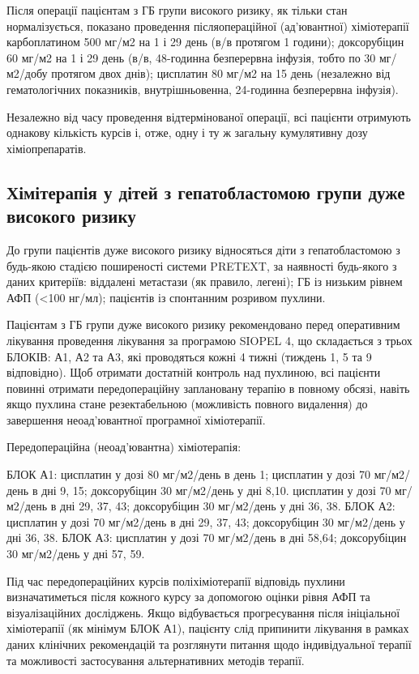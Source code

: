 Після операції пацієнтам з ГБ групи високого ризику, як тільки стан нормалізується, показано проведення післяопераційної (ад'ювантної) хіміотерапії карбоплатином 500 мг/м2 на 1 і 29 день (в/в протягом 1 години); доксорубіцин 60 мг/м2 на 1 і 29 день (в/в, 48-годинна безперервна інфузія, тобто по 30 мг/м2/добу протягом двох днів); цисплатин 80 мг/м2 на 15 день (незалежно від гематологічних показників, внутрішньовенна, 24-годинна безперервна інфузія)\cite{pmid28921939}.

Незалежно від часу проведення відтермінованої операції, всі пацієнти отримують однакову кількість курсів і, отже, одну і ту ж загальну кумулятивну дозу хіміопрепаратів.

\subsection{Хімітерапія у дітей з гепатобластомою групи дуже високого ризику}

До групи пацієнтів дуже високого ризику відносяться діти з гепатобластомою з будь-якою стадією поширеності системи PRETEXT, за наявності будь-якого з даних критеріїв: віддалені метастази (як правило, легені); ГБ із низьким рівнем АФП (<100 нг/мл); пацієнтів із спонтанним розривом пухлини.

Пацієнтам з ГБ групи дуже високого ризику рекомендовано перед оперативним лікування проведення лікування за програмою SIOPEL 4, що складається з трьох БЛОКІВ: А1, А2 та А3, які проводяться кожні 4 тижні (тиждень 1, 5 та 9 відповідно). Щоб отримати достатній контроль над пухлиною, всі пацієнти повинні отримати передопераційну заплановану терапію в повному обсязі, навіть якщо пухлина стане резектабельною (можливість повного видалення) до завершення неоад'ювантної програмної хіміотерапії\cite{pmid14966740}.

Передопераційна (неоад'ювантна) хіміотерапія:

БЛОК А1: цисплатин у дозі 80 мг/м2/день в день 1; цисплатин у дозі 70 мг/м2/день в дні 9, 15; доксорубіцин 30 мг/м2/день у дні 8,10. цисплатин у дозі 70 мг/м2/день в дні 29, 37, 43; доксорубіцин 30 мг/м2/день у дні 36, 38. 
БЛОК А2: цисплатин у дозі 70 мг/м2/день в дні 29, 37, 43; доксорубіцин 30 мг/м2/день у дні 36, 38.
БЛОК А3: цисплатин у дозі 70 мг/м2/день в дні 58,64; доксорубіцин 30 мг/м2/день у дні 57, 59.

Під час передопераційних курсів поліхіміотерапії відповідь пухлини визначатиметься після кожного курсу за допомогою оцінки рівня АФП та візуалізаційних досліджень\cite{pmid12461796}. Якщо відбувається прогресування після ініціальної хіміотерапії (як мінімум БЛОК А1), пацієнту слід припинити лікування в рамках даних клінічних рекомендацій та розглянути питання щодо індивідуальної терапії та можливості застосування альтернативних методів терапії\cite{pmid22648963}.

